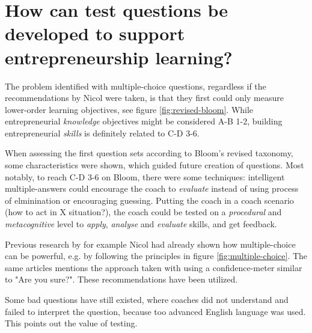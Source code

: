 
\section{How can test questions be developed to support entrepreneurship learning?} %

  The problem identified with multiple-choice questions, regardless if the recommendations by Nicol \cite{nicol} were taken, is that they first could only measure lower-order learning objectives, see figure \ref{fig:revised-bloom}. While entrepreneurial \textit{knowledge} objectives might be considered A-B 1-2, building entrepreneurial \textit{skills} is definitely related to C-D 3-6.

  When assessing the first question sets according to Bloom's revised taxonomy, some characteristics were shown, which guided future creation of questions. Most notably, to reach C-D 3-6 on Bloom, there were some techniques: intelligent multiple-answers could encourage the coach to \textit{evaluate} instead of using process of elminination or encouraging guessing. Putting the coach in a coach scenario (how to act in X situation?), the coach could be tested on a \textit{procedural} and \textit{metacognitive} level to \textit{apply}, \textit{analyse} and \textit{evaluate} skills, and get feedback.

  Previous research by for example Nicol \cite{nicol} had already shown how multiple-choice can be powerful, e.g. by following the principles in figure \ref{fig:multiple-choice}. The same articles mentions the approach taken with using a confidence-meter similar to "Are you sure?". These recommendations have been utilized.

  Some bad questions have still existed, where coaches did not understand and failed to interpret the question, because too advanced English language was used. This points out the value of testing.



